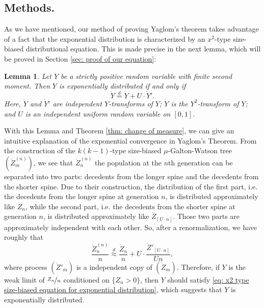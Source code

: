 \documentclass[12pt,a4paper]{amsart}
\newtheorem{lem}[thm]{Lemma}
\numberwithin{equation}{section}
\begin{document}
\subsection{Methods.} 
	As we have mentioned, our method of proving Yaglom's theorem takes advantage of a fact that the exponential distribution is characterized by an $x^2$-type size-biased distributional equation. 
	This is made precise in the next lemma, which will be proved in Section \ref{sec: proof of our equation}:
\begin{lem} \label{lem: our equation}
	Let $Y$ be a strictly positive random variable with finite second moment. 
	Then $Y$ is exponentially distributed if and only if 
\begin{equation} 
\label{eq: x2 type size-biased equation for exponential distribution}
	\ddot Y \overset{d}
	= \dot Y + U \cdot \dot Y'.
\end{equation}
	Here, $\dot Y$ and $\dot Y'$ are independent $Y$-transforms of $Y$; $\ddot Y$ is the $Y^2$-transform of $Y$; and $U$ is an independent uniform random variable on $[0,1]$.
\end{lem}	
	With this Lemma and Theorem \ref{thm: change of measure}, we can give an intuitive explanation of the exponential convergence in Yaglom's Theorem.
	From the construction of the $k(k-1)$-type size-biased $\mu$-Galton-Watson tree $(\ddot Z^{(n)}_m)$, we see that $\ddot Z^{(n)}_n$ the population at the $n$th generation can be separated into two parts: decedents from the longer spine and the decedents from the shorter spine. 
	Due to their construction, the distribution of the first part, i.e. the decedents from the longer spine at generation $n$, is distributed approximately like $\dot Z_n$, while the second part, i.e. the decedents from the shorter spine at generation $n$, is distributed approximately like $\dot Z_{[U\cdot n]}$. 
	Those two parts are approximately independent with each other.
	So, after a renormalization, we have roughly that
\begin{equation}
\label{eq: Our insight}
	\frac{\ddot Z_n^{(n)}}{n} 
	\overset{d} \approx \frac{\dot Z_n}{n} + U \cdot \frac{\dot Z'_{[U\cdot n]}}{Un},
\end{equation} 
	where process $(\dot Z'_m)$ is a independent copy of $(\dot Z_m)$.
	Therefore, if $Y$ is the weak limit of $\nicefrac{Z_n}{n}$ conditioned on $\{Z_n > 0\}$, then $Y$ should satisfy \eqref{eq: x2 type size-biased equation for exponential distribution}, which suggests that $Y$ is exponentially distributed. 
	
\end{document}
